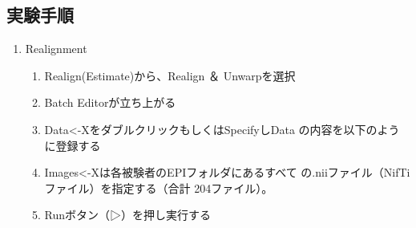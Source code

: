 \documentclass{jlreq}
\begin{document}
\subsection{実験手順}
\begin{enumerate}
    \item Realignment
    \begin{enumerate}
        \item Realign(Estimate)から、Realign ＆ Unwarpを選択
        \item Batch Editorが立ち上がる
        \item Data<-XをダブルクリックもしくはSpecifyしData
の内容を以下のように登録する 
        \item Images<-Xは各被験者のEPIフォルダにあるすべて
の.niiファイル（NifTiファイル）を指定する（合計
204ファイル）。
        \item Runボタン（▷）を押し実行する 
    \end{enumerate}


\end{enumerate}
\end{document}
